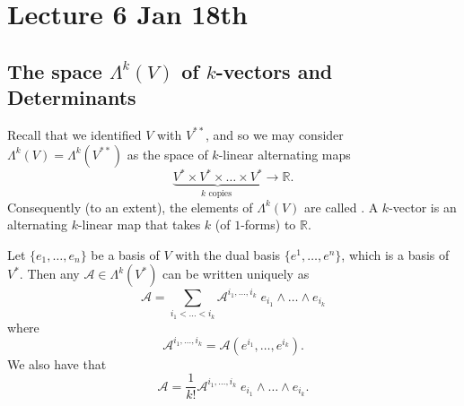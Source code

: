 \documentclass[notoc,notitlepage]{tufte-book}
\begin{document}


\label{part:the_vector_space_r_n_as_a_smooth_manifold}

\chapter{Lecture 6 Jan 18th}%
\label{chp:lecture_6_jan_18th}

\section{The space \texorpdfstring{$\Lambda^k(V)$}{Lambda k(V)} of \texorpdfstring{$k$}{k}-vectors and Determinants}%
\label{sec:the_space_lambda_k_v_of_k_vectors_and_determinants}

Recall that we identified $V$ with $V^{**}$, and so we may consider
$\Lambda^k(V) = \Lambda^k(V^{**})$ as the space of $k$-linear alternating maps
\begin{equation*}
  \underbrace{V^* \times V^* \times \hdots \times V^*}_{k \text{ copies }} \to \mathbb{R}.
\end{equation*}
Consequently (to an extent), the elements of $\Lambda^k(V)$ are called .
A $k$-vector is an alternating $k$-linear map that takes $k$  (of $1$-forms)
to $\mathbb{R}$.

\begin{eg}
  Let $\{ e_1, \ldots, e_n \}$ be a basis of $V$ with the dual basis
  $\{ e^1, \ldots, e^n \}$, which is a basis of $V^*$. Then any
  $\mathcal{A} \in \Lambda^k(V^*)$ can be written uniquely as
  \begin{equation*}
    \mathcal{A} = \sum_{i_1 < \hdots < i_k} \mathcal{A}^{i_1, \ldots, i_k} \;
      e_{i_1} \land \hdots \land e_{i_k}
  \end{equation*}
  where
  \begin{equation*}
    \mathcal{A}^{i_1, \ldots, i_k} = \mathcal{A} \left( e^{i_1}, \ldots, e^{i_k} \right).
  \end{equation*}
  We also have that
  \begin{equation*}
    \mathcal{A} = \frac{1}{k!} \mathcal{A}^{i_1, \ldots, i_k} \; e_{i_1} \land \hdots \land e_{i_k}.
  \end{equation*}
\end{eg}
\end{document}
